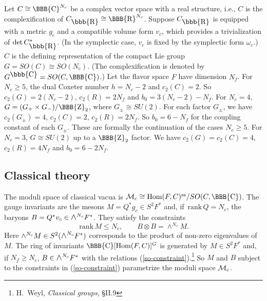 \documentclass[lecture]{qft-l}
\newcommand{\om}{\omega}
\newcommand{\ZZ}{{\mbox{\BBB{Z}}}}
\newcommand{\re}{{\mbox{\bbb{R}}}}
\newcommand{\RE}{{\mbox{\BBB{R}}}}
\newcommand{\co}{{\mbox{\bbb{C}}}}
\newcommand{\CO}{{\mbox{\BBB{C}}}}
\newcommand{\medwedge}{\mbox{\fontsize{12pt}{0pt}\selectfont $\wedge$}}
\newcommand{\Hom}{{\rm Hom}}
\newcommand{\sss}{^{\mathrm{ss}}}
\newcommand{\rank}{\mathrm{\,rank\,}}
\newcommand{\MM}{{\mathcal M}}
\newcommand{\MC}{\MM_{{\rm c}}}
\def\Subhead#1{\subsection*{#1}}
\begin{document}

Let $C\cong\CO^{N_c}$ be a complex vector space with a real structure,
i.e., $C$ is the complexification of $C_\re\cong\RE^{N_c}$.
Suppose $C_\re$ is equipped with a metric $g_c$ and a compatible volume form
$v_c$, which provides a trivialization of $\det C_\re^*$.
(In the symplectic case, $v_c$ is fixed by the symplectic form $\om_c$.)
$C$ is the defining representation of the compact Lie group 
$G=SO(C)\cong SO(N_c)$.
(The complexification is denoted by $G^\co=SO(C,\CO)$.)
Let the flavor space $F$ have dimension $N_f$.
For $N_c\ge5$, the dual Coxeter number $h=N_c-2$ and $c_2(C)=2$.
So $c_2(G)=2(N_c-2)$, $c_2(R)=2N_f$ and $b_0=3(N_c-2)-N_f$.
For $N_c=4$, $G=(G_+\times G_-)/\ZZ_2$, where $G_\pm\cong SU(2)$.
For each factor $G_\pm$, we have $c_2(G_\pm)=4$, $c_2(C)=2$, $c_2(R)=2N_f$.
So $b_0=6-N_f$ for the coupling constant of each $G_\pm$.
These are formally the continuation of the cases $N_c\ge5$.
For $N_c=3$, $G\cong SU(2)$ up to a $\ZZ_2$ factor.
We have $c_2(G)=c_2(C)=4$, $c_2(R)=4N_f$ and $b_0=6-2N_f$.


\Subhead{Classical theory}

The moduli space of classical vacua is $\MC\cong\Hom(F,C)\sss/SO(C,\CO)$.
The gauge invariants are the mesons $M=Q^*g_c\in S^2F^*$ and,
if $\rank Q=N_c$, the baryons $B=Q^*v_c\in\medwedge^{N_c}F^*$.
They satisfy the constraints 
	\begin{equation}\label{so-constraint}
\rank M\le N_c,\quad\quad B\otimes B=\wedge^{N_c}M.
	\end{equation}
Here $\wedge^{N_c}M\in S^2(\medwedge^{N_c}F^*)$ corresponds to the product
of non-zero eigenvalues of $M$.
The ring of invariants $\CO[\Hom(F,C)]^G$ is generated by $M\in S^2F^*$ and,
if $N_f\ge N_c$, $B\in\medwedge^{N_c}F^*$ with the relations
(\ref{so-constraint}).\footnote{H.\ Weyl, {\it Classical groups}, \S II.9}
So $M$ and $B$ subject to the constraints in (\ref{so-constraint})
parametrize the moduli space $\MC$.
\end{document}
